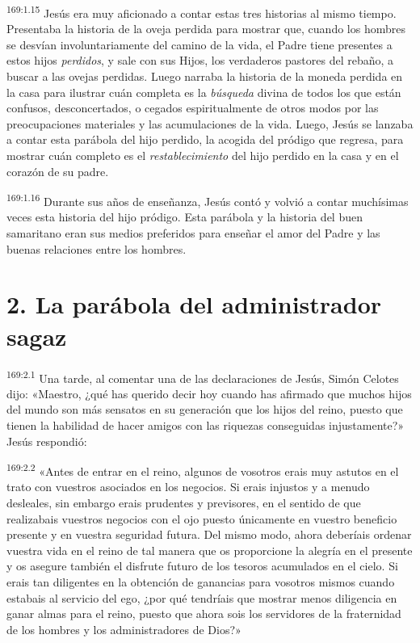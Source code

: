 \par 
\textsuperscript{169:1.15} Jesús era muy aficionado a contar estas tres historias al mismo tiempo. Presentaba la historia de la oveja perdida para mostrar que, cuando los hombres se desvían involuntariamente del camino de la vida, el Padre tiene presentes a estos hijos \textit{perdidos}, y sale con sus Hijos, los verdaderos pastores del rebaño, a buscar a las ovejas perdidas. Luego narraba la historia de la moneda perdida en la casa para ilustrar cuán completa es la \textit{búsqueda} divina de todos los que están confusos, desconcertados, o cegados espiritualmente de otros modos por las preocupaciones materiales y las acumulaciones de la vida. Luego, Jesús se lanzaba a contar esta parábola del hijo perdido, la acogida del pródigo que regresa, para mostrar cuán completo es el \textit{restablecimiento} del hijo perdido en la casa y en el corazón de su padre.

\par 
\textsuperscript{169:1.16} Durante sus años de enseñanza, Jesús contó y volvió a contar muchísimas veces esta historia del hijo pródigo. Esta parábola y la historia del buen samaritano eran sus medios preferidos para enseñar el amor del Padre y las buenas relaciones entre los hombres.

\section*{2. La parábola del administrador sagaz}
\par 
\textsuperscript{169:2.1} Una tarde, al comentar una de las declaraciones de Jesús, Simón Celotes dijo: «Maestro, ¿qué has querido decir hoy cuando has afirmado que muchos hijos del mundo son más sensatos en su generación que los hijos del reino, puesto que tienen la habilidad de hacer amigos con las riquezas conseguidas injustamente?» Jesús respondió:

\par 
\textsuperscript{169:2.2} «Antes de entrar en el reino, algunos de vosotros erais muy astutos en el trato con vuestros asociados en los negocios. Si erais injustos y a menudo desleales, sin embargo erais prudentes y previsores, en el sentido de que realizabais vuestros negocios con el ojo puesto únicamente en vuestro beneficio presente y en vuestra seguridad futura. Del mismo modo, ahora deberíais ordenar vuestra vida en el reino de tal manera que os proporcione la alegría en el presente y os asegure también el disfrute futuro de los tesoros acumulados en el cielo. Si erais tan diligentes en la obtención de ganancias para vosotros mismos cuando estabais al servicio del ego, ¿por qué tendríais que mostrar menos diligencia en ganar almas para el reino, puesto que ahora sois los servidores de la fraternidad de los hombres y los administradores de Dios?»

